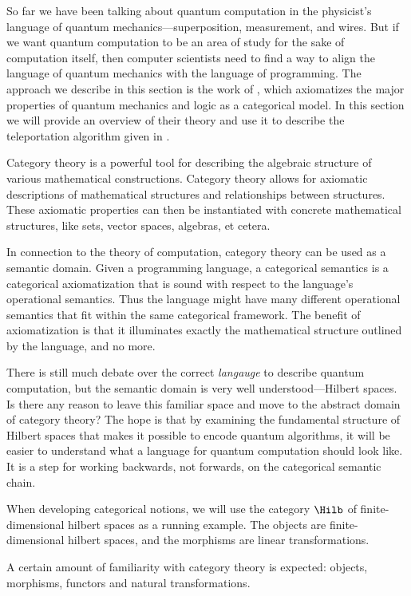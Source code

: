 So far we have been talking about quantum computation in the physicist's language
of quantum mechanics---superposition, measurement, and wires. 
But if we want quantum computation to be an area of study for the sake of
computation itself, then computer scientists need to find a way to align
the language of quantum mechanics with the language of programming.
The approach we describe in this section is the work of \cite{abramsky2009categorical},
which axiomatizes the major properties of quantum mechanics and logic as a categorical model.
In this section we will provide an overview of their theory and use it to describe the
teleportation algorithm given in .

Category theory is a powerful tool for describing the algebraic structure of
various mathematical constructions. Category theory allows for axiomatic descriptions
of mathematical structures and relationships between structures. These axiomatic
properties can then be instantiated with concrete mathematical structures, like sets,
vector spaces, algebras, et cetera. 

In connection to the theory of computation, category theory can be used as a semantic
domain. Given a programming language, a categorical semantics is a categorical axiomatization
that is sound with respect to the language's operational semantics. 
Thus the language might have many different operational semantics that fit within the same
categorical framework. 
The benefit of axiomatization is that it illuminates exactly the mathematical structure
outlined by the language, and no more.

There is still much debate over the correct \emph{langauge} to describe quantum computation,
but the semantic domain is very well understood---Hilbert spaces.
Is there any reason to leave this familiar space and move to the abstract domain of category theory?
The hope is that by examining the fundamental structure of Hilbert spaces that makes it possible
to encode quantum algorithms, it will be easier to understand what a language for
quantum computation should look like. It is a step for working backwards, not forwards,
on the categorical semantic chain.

When developing categorical notions, we will use the category $\Hilb$ of finite-dimensional
hilbert spaces as a running example. The objects are finite-dimensional hilbert spaces,
and the morphisms are linear transformations. 

A certain amount of familiarity with category theory is expected: objects, morphisms,
functors and natural transformations.


